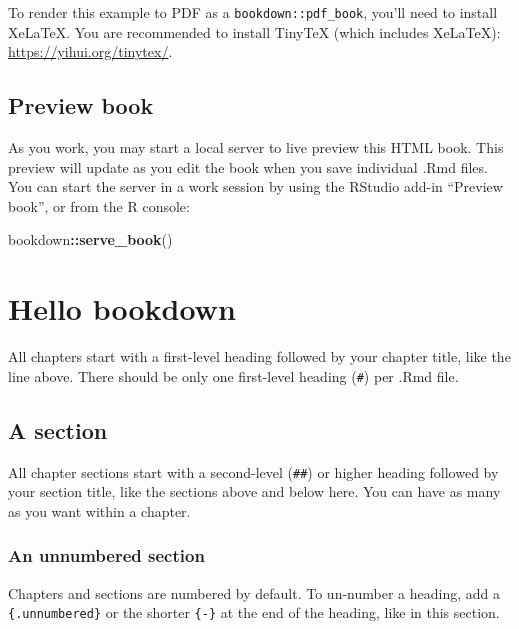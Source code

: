 \documentclass[
]{book}
\newenvironment{Shaded}{\begin{snugshade}}{\end{snugshade}}
\newcommand{\FunctionTok}[1]{\textcolor[rgb]{0.13,0.29,0.53}{\textbf{#1}}}
\newcommand{\NormalTok}[1]{#1}
\newcommand{\SpecialCharTok}[1]{\textcolor[rgb]{0.81,0.36,0.00}{\textbf{#1}}}
\theoremstyle{definition}
\theoremstyle{definition}
\theoremstyle{definition}
\theoremstyle{definition}
\theoremstyle{remark}
\begin{document}
To render this example to PDF as a \texttt{bookdown::pdf\_book}, you'll need to install XeLaTeX. You are recommended to install TinyTeX (which includes XeLaTeX): \url{https://yihui.org/tinytex/}.

\subsection{Preview book}\label{preview-book}

As you work, you may start a local server to live preview this HTML book. This preview will update as you edit the book when you save individual .Rmd files. You can start the server in a work session by using the RStudio add-in ``Preview book'', or from the R console:

\begin{Shaded}
\begin{Highlighting}[]
\NormalTok{bookdown}\SpecialCharTok{::}\FunctionTok{serve\_book}\NormalTok{()}
\end{Highlighting}
\end{Shaded}

\section{Hello bookdown}\label{hello-bookdown}

All chapters start with a first-level heading followed by your chapter title, like the line above. There should be only one first-level heading (\texttt{\#}) per .Rmd file.

\subsection{A section}\label{a-section}

All chapter sections start with a second-level (\texttt{\#\#}) or higher heading followed by your section title, like the sections above and below here. You can have as many as you want within a chapter.

\subsubsection*{An unnumbered section}\label{an-unnumbered-section}

Chapters and sections are numbered by default. To un-number a heading, add a \texttt{\{.unnumbered\}} or the shorter \texttt{\{-\}} at the end of the heading, like in this section.
\end{document}
